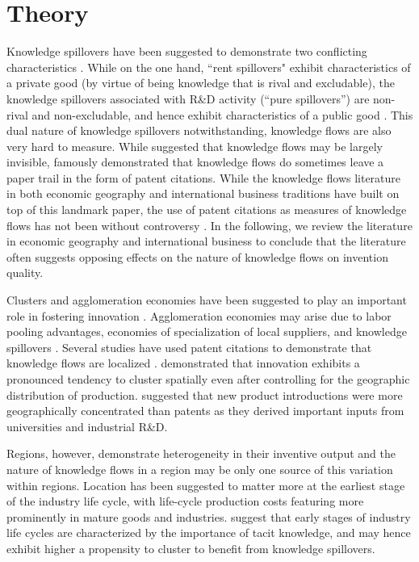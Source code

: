 \documentclass[12pt,letterpaper]{article}
\begin{document}
\section*{Theory}
Knowledge spillovers have been suggested to demonstrate two conflicting characteristics \citep{Griliches1979}. While on the one hand, ``rent spillovers" exhibit characteristics of a private good (by virtue of being knowledge that is rival and excludable), the knowledge spillovers associated with R\&D activity (``pure spillovers'') are non-rival and non-excludable, and hence exhibit characteristics of a public good \citep{Arrow1962}.  This dual nature of knowledge spillovers notwithstanding, knowledge flows are also very hard to measure.  While \cite{Krugman1991a} suggested that knowledge flows may be largely invisible, \cite*{Jaffe1993} famously demonstrated that  knowledge flows do sometimes leave a paper trail in the form of patent citations. While the knowledge flows literature in both economic geography and international business traditions have built on top of this landmark paper, the use of patent citations as measures of knowledge flows has not been without controversy \citep*{Arora2017a, Alcacer2006a}.  In the following, we review the literature in economic geography and international business to conclude that the literature often suggests opposing effects on the nature of knowledge flows on invention quality. 

Clusters and agglomeration economies have been suggested to play an important role in fostering innovation \citep{Marshall1890, Porter1990}. Agglomeration economies may arise due to labor pooling advantages, economies of specialization of local suppliers, and knowledge spillovers \citep{Porter1990, Krugman1991a}.  Several studies have used patent citations to demonstrate that knowledge flows are localized \citep{Jaffe1993, Almeida1999}. \cite{Audretsch1996a} demonstrated that innovation exhibits a pronounced tendency to cluster spatially even after controlling for the geographic distribution of production. \cite*{Acs1994} suggested that new product introductions were more geographically concentrated than patents as  they derived important inputs from universities and industrial R\&D. \par

Regions, however, demonstrate heterogeneity in their inventive output \citep*{Agrawal2014b} and the nature of knowledge flows in a region may be only one source of this variation within regions. Location has been suggested to matter more at the earliest stage of the industry life cycle, with life-cycle production costs featuring more prominently in mature goods and industries. \cite{Audretsch1996b} suggest that early stages of  industry life cycles are characterized by the importance of tacit knowledge, and may hence exhibit higher a propensity to cluster to benefit from knowledge spillovers. \par
\end{document}
